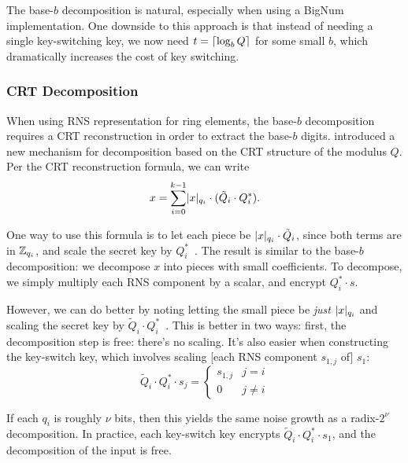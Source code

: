 \documentclass[../../fheimpl.tex]{subfiles}
\begin{document}
The base-$b$ decomposition is natural, especially when using a BigNum implementation. One downside to this approach is that instead of needing a single key-switching key, we now need $t=\lceil\log_b{Q}\rceil$ for some small $b$, which dramatically increases the cost of key switching.

\subsubsection{CRT Decomposition}
\label{sec:ks-crt-decomposition}
When using RNS representation for ring elements, the base-$b$ decomposition requires a CRT reconstruction in order to extract the base-$b$ digits. \cite{cryptoeprint:2016/510} introduced a new mechanism for decomposition based on the CRT structure of the modulus $Q$. Per the CRT reconstruction formula, we can write
\[x = \sum_{i=0}^{k-1}\lvert x\rvert_{q_i}\cdot (\tilde{Q}_i\cdot Q_i^*).\]

One way to use this formula is to let each piece be $\lvert x\rvert_{q_i}\cdot \tilde{Q}_i$, since both terms are in $\mathbb{Z}_{q_i}$, and scale the secret key by $Q_i^*$~\cite{cryptoeprint:2019/688}. The result is similar to the base-$b$ decomposition: we decompose $x$ into pieces with small coefficients. To decompose, we simply multiply each RNS component by a scalar, and encrypt $Q_i^* \cdot s$.

However, we can do better by noting letting the small piece be \emph{just} $\lvert x\rvert_{q_i}$ and scaling the secret key by $\tilde{Q}_i\cdot Q_i^*$~\cite{cryptoeprint:2020/1203}. This is better in two ways: first, the decomposition step is free: there's no scaling. It's also easier when constructing the key-switch key, which involves scaling [each RNS component $s_{1,j}$ of] $s_1$: 
\[\tilde{Q}_i\cdot Q_i^*\cdot s_j = \begin{cases}
	s_{1,j} & j = i \\
	0 & j \ne i 
\end{cases}
\]

If each $q_i$ is roughly $\nu$ bits, then this yields the same noise growth as a radix-$2^\nu$ decomposition. In practice, each key-switch key encrypts $\tilde{Q}_i\cdot Q_i^*\cdot s_1$, and the decomposition of the input is free.
\end{document}
